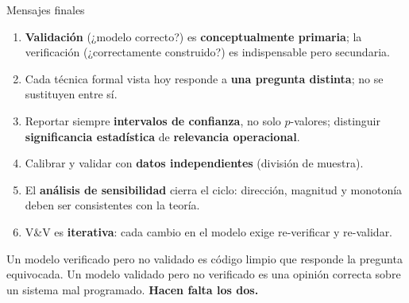 \documentclass[aspectratio=1610, 10pt]{beamer}
\begin{document}
\begin{frame}{Mensajes finales}
  \begin{enumerate}\small\itemsep4pt
    \item \textbf{Validación} (¿modelo correcto?) es \textbf{conceptualmente
      primaria}; la verificación (¿correctamente construido?) es indispensable
      pero secundaria.
    \item Cada técnica formal vista hoy responde a \textbf{una pregunta distinta};
      no se sustituyen entre sí.
    \item Reportar siempre \textbf{intervalos de confianza}, no solo $p$-valores;
      distinguir \textbf{significancia estadística} de \textbf{relevancia operacional}.
    \item Calibrar y validar con \textbf{datos independientes} (división de muestra).
    \item El \textbf{análisis de sensibilidad} cierra el ciclo: dirección,
      magnitud y monotonía deben ser consistentes con la teoría.
    \item V\&V es \textbf{iterativa}: cada cambio en el modelo exige
      re-verificar y re-validar.
  \end{enumerate}

  \vspace{6pt}
  \begin{alertabox}
    \footnotesize
    Un modelo verificado pero no validado es código limpio que responde la
    pregunta equivocada. Un modelo validado pero no verificado es una opinión
    correcta sobre un sistema mal programado. \textbf{Hacen falta los dos.}
  \end{alertabox}
\end{frame}
\end{document}
